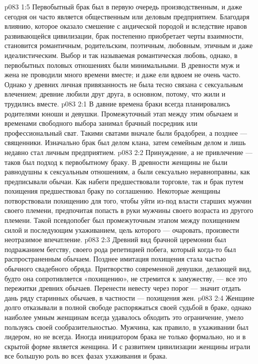 \vs p083 1:5 Первобытный брак был в первую очередь производственным, и даже сегодня он часто является общественным или деловым предприятием. Благодаря влиянию, которое оказало смешение с андической породой и вследствие нравов развивающейся цивилизации, брак постепенно приобретает черты взаимности, становится романтичным, родительским, поэтичным, любовным, этичным и даже идеалистическим. Выбор и так называемая романтическая любовь, однако, в первобытных половых отношениях были минимальными. В древности муж и жена не проводили много времени вместе; и даже ели вдвоем не очень часто. Однако у древних личная привязанность не была тесно связана с сексуальным влечением; древние любили друг друга, в основном, потому, что жили и трудились вместе.
\vs p083 2:1 В давние времена браки всегда планировались родителями юноши и девушки. Промежуточный этап между этим обычаем и временами свободного выбора занимал брачный посредник или профессиональный сват. Такими сватами вначале были брадобреи, а позднее --- священники. Изначально брак был делом клана, затем семейным делом и лишь недавно стал личным предприятием.
\vs p083 2:2 Принуждение, а не привлечение --- таков был подход к первобытному браку. В древности женщины не были равнодушны к сексуальным отношениям, а были сексуально неравноправны, как предписывали обычаи. Как набеги предшествовали торговле, так и брак путем похищения предшествовал браку по соглашению. Некоторые женщины потворствовали похищению для того, чтобы уйти из\hyp{}под власти старших мужчин своего племени, предпочитая попасть в руки мужчины своего возраста из другого племени. Такой псевдопобег был промежуточным этапом между похищением силой и последующим ухаживанием, цель которого --- очаровать, произвести неотразимое впечатление.
\vs p083 2:3 Древний вид брачной церемонии был подражанием бегству, своего рода репетицией побега, который когда\hyp{}то был распространенным обычаем. Позднее имитация похищения стала частью обычного свадебного обряда. Притворство современной девушки, делающей вид, будто она сопротивляется «похищению», не стремится к замужеству, --- все это пережитки древних обычаев. Перенести невесту через порог --- значит отдать дань ряду старинных обычаев, в частности --- похищения жен.
\vs p083 2:4 Женщине долго отказывали в полной свободе распоряжаться своей судьбой в браке, однако наиболее умным женщинам всегда удавалось обходить это ограничение, умело пользуясь своей сообразительностью. Мужчина, как правило, в ухаживании был лидером, но не всегда. Иногда инициатором брака не только формально, но и в скрытой форме является женщина. И с развитием цивилизации женщины играли все большую роль во всех фазах ухаживания и брака.
